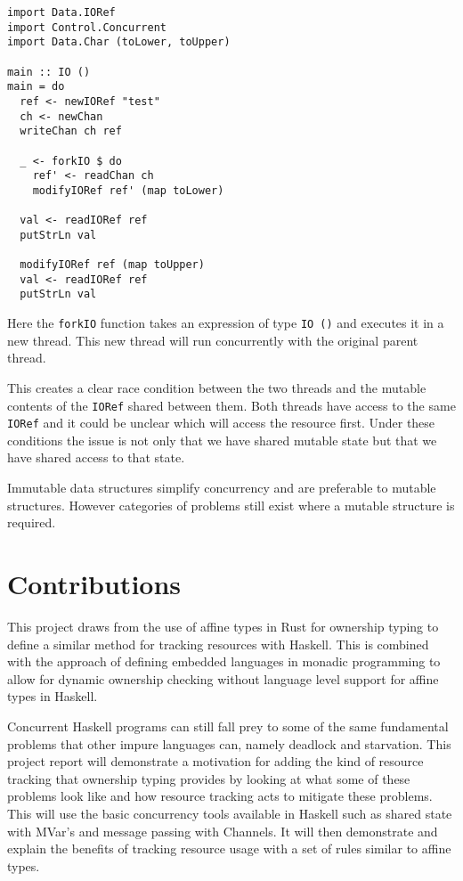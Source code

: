 \documentclass[onehalf,11pt]{beavtex}
\begin{document}
\begin{verbatim}
import Data.IORef
import Control.Concurrent
import Data.Char (toLower, toUpper)

main :: IO ()
main = do
  ref <- newIORef "test"
  ch <- newChan
  writeChan ch ref

  _ <- forkIO $ do
    ref' <- readChan ch
    modifyIORef ref' (map toLower)

  val <- readIORef ref
  putStrLn val

  modifyIORef ref (map toUpper)
  val <- readIORef ref
  putStrLn val
\end{verbatim}

Here the \texttt{forkIO} function takes an expression of type \texttt{IO ()}
and executes it in a new thread.
This new thread will run concurrently with the original parent thread.

This creates a clear race condition between the two threads and the mutable
contents of the \texttt{IORef} shared between them.
Both threads have access to the same \texttt{IORef} and it could be unclear
which will access the resource first. Under these conditions the issue is not
only that we have shared mutable state but that we have shared access to that
state.

Immutable data structures simplify concurrency and are preferable to
mutable structures. However categories of problems still exist where a
mutable structure is required.


\section{Contributions}

This project draws from the use of affine types in Rust for
ownership typing to define a similar method for tracking resources with Haskell.
This is combined with the approach of defining embedded languages in monadic
programming to allow for dynamic ownership checking without language level
support for affine types in Haskell.

Concurrent Haskell programs can still fall prey to some of the same fundamental
problems that other impure languages can, namely deadlock and starvation.
This project report will demonstrate a motivation for adding the kind of
resource tracking that ownership typing provides by looking at what some of
these problems look like and how resource tracking acts to mitigate these
problems.  This will use the basic concurrency tools available in Haskell
such as shared state with MVar's and message passing with Channels.
It will then demonstrate and explain the benefits of tracking resource usage
with a set of rules similar to affine types.
\end{document}
